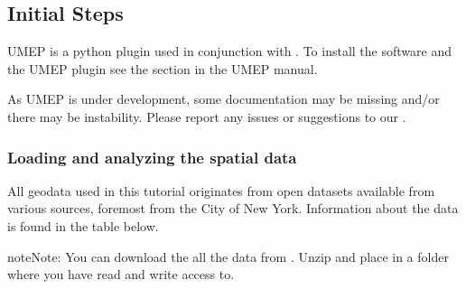 \documentclass[letterpaper,10pt,english]{sphinxmanual}
\begin{document}
\subsection{Initial Steps}
\label{\detokenize{Tutorials/SuewsSpatial:initial-steps}}
UMEP is a python plugin used in conjunction with
. To install the software and the UMEP
plugin see the {\hyperref[\detokenize{Getting_Started:getting-started}]{}} section in the UMEP manual.

As UMEP is under development, some documentation may be missing and/or
there may be instability. Please report any issues or suggestions to our
.


\subsubsection{Loading and analyzing the spatial data}
\label{\detokenize{Tutorials/SuewsSpatial:loading-and-analyzing-the-spatial-data}}
All geodata used in this tutorial originates from open datasets available from various sources, foremost from the City of New York. Information about the data is found in the table below.

\begin{sphinxadmonition}{note}{Note:}
You can download the all the data from . Unzip and place in a folder where you have read and write access to.
\end{sphinxadmonition}
\end{document}
